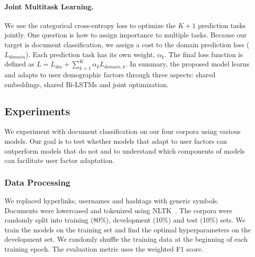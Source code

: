 \paragraph{Joint Multitask Learning.} 
We use the categorical cross-entropy loss to optimize the $K+1$ prediction tasks jointly. One question is how to assign importance to multiple tasks. Because our target is document classification, we assign a cost to the domain prediction loss ($L_{domain}$). Each prediction task has its own weight, $\alpha_k$. The final loss function is defined as $L = L_{doc} + \sum_{k=1}^K \alpha_k L_{domain, k}$. In summary, the proposed model learns and adapts to user demographic factors through three aspects: shared embeddings, shared Bi-LSTMs and joint optimization.


\subsection{Experiments}
\label{chap4:sec:dem_exp}
  
We experiment with document classification on our four corpora using various models. Our goal is to test whether models that adapt to user factors can outperform models that do not and to understand which components of models can facilitate user factor adaptation.
  
\subsubsection{Data Processing}

We replaced hyperlinks, usernames and hashtags with generic symbols. Documents were lowercased and tokenized using NLTK~\cite{bird2004nltk}. 
The corpora were randomly split into training (80\%), development (10\%) and test (10\%) sets.
We train the models on the training set and find the optimal hyperparameters on the development set. We randomly shuffle the training data at the beginning of each training epoch. The evaluation metric uses the weighted F1 score.

%
%

